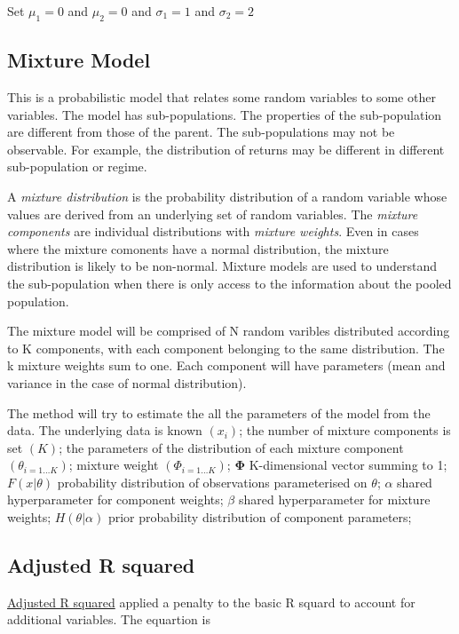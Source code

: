 \documentclass[12pt, a4paper, oneside]{article}\usepackage[]{graphicx}\usepackage[]{color}
\begin{document}
Set $\mu_1 = 0$ and $\mu_2 = 0$ and $\sigma_1 = 1$ and $\sigma_2 = 2$

\subsection{Mixture Model}
This is a probabilistic model that relates some random variables to some other variables.  The model has sub-populations. The properties of the sub-population are different from those of the parent. The sub-populations may not be observable.  For example, the distribution of returns may be different in different sub-population or regime. 

A \emph{mixture distribution} is the probability distribution of a random variable  whose values are derived from an underlying set of random variables. The \emph{mixture components} are individual distributions with \emph{mixture weights}.  Even in cases where the mixture comonents have a normal distribution, the mixture distribution is likely to be non-normal. Mixture models are used to understand the sub-population when there is only access to the information about the pooled population. 

The mixture model will be comprised of N random varibles distributed according to K components, with each component belonging to the same distribution. The k mixture weights sum to one. Each component will have parameters (mean and variance in the case of normal distribution).  

The method will try to estimate the all the parameters of the model from the data.  The underlying data is known $(x_i)$; the number of mixture components is set $(K)$; the parameters of the distribution of each mixture component $(\theta_{i=1\dots K})$; mixture weight $(\Phi_{i = 1\dots K})$; $\mathbf{\Phi}$ K-dimensional vector summing to 1; $F(x|\theta)$ probability distribution of observations parameterised on $\theta$; $\alpha$ shared hyperparameter for component weights; $\beta$ shared hyperparameter for mixture weights; $H(\theta|\alpha)$ prior probability distribution of component parameters; 

\subsection{Adjusted R squared}
\href{http://davegiles.blogspot.ca/2013/05/when-will-adjusted-r-squared-increase.html}{Adjusted R squared} applied a penalty to the basic R squard to account for additional variables.  The equartion is 
\end{document}
